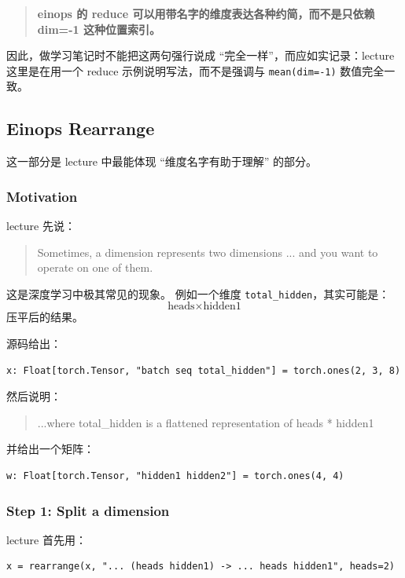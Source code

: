 \documentclass[a4paper,UTF8]{article}
\numberwithin{equation}{section}
\begin{document}
\begin{quote}
\textbf{einops 的 reduce 可以用带名字的维度表达各种约简，而不是只依赖 dim=-1 这种位置索引。}
\end{quote}

因此，做学习笔记时不能把这两句强行说成 ``完全一样''，而应如实记录：lecture 这里是在用一个 reduce 示例说明写法，而不是强调与 \verb|mean(dim=-1)| 数值完全一致。

\subsection{Einops Rearrange}

这一部分是 lecture 中最能体现 ``维度名字有助于理解'' 的部分。

\subsubsection{Motivation}

lecture 先说：
\begin{quote}
Sometimes, a dimension represents two dimensions ... and you want to operate on one of them.
\end{quote}

这是深度学习中极其常见的现象。  
例如一个维度 \verb|total_hidden|，其实可能是：
\[
\text{heads} \times \text{hidden1}
\]
压平后的结果。

源码给出：
\begin{verbatim}
x: Float[torch.Tensor, "batch seq total_hidden"] = torch.ones(2, 3, 8)
\end{verbatim}

然后说明：
\begin{quote}
...where total\_hidden is a flattened representation of heads * hidden1
\end{quote}

并给出一个矩阵：
\begin{verbatim}
w: Float[torch.Tensor, "hidden1 hidden2"] = torch.ones(4, 4)
\end{verbatim}

\subsubsection{Step 1: Split a dimension}

lecture 首先用：
\begin{verbatim}
x = rearrange(x, "... (heads hidden1) -> ... heads hidden1", heads=2)
\end{verbatim}
\end{document}
